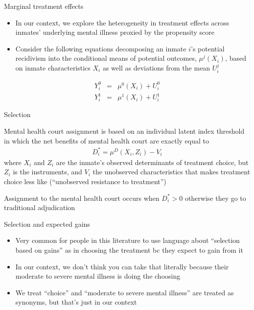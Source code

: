 \documentclass{beamer}
\begin{document}
\begin{frame}{Marginal treatment effects}

  \begin{itemize}
    \item In our context, we explore the heterogeneity in treatment effects across inmates' underlying mental illness proxied by the propensity score
    \item Consider the following equations decomposing an inmate $i$'s potential recidivism into the conditional means of potential outcomes, $\mu^j(X_i)$, based on inmate characteristics $X_i$ as well as deviations from the mean $U_i^j$
  \end{itemize}

  \begin{eqnarray*}
    Y_i^0 &=& \mu^0(X_i) + U_i^0 \\
    Y_i^1 &=& \mu^1(X_i) + U_i^1
  \end{eqnarray*}

\end{frame}

\begin{frame}{Selection}


  Mental health court assignment is based on an individual latent index threshold in which the net benefits of mental health court are exactly equal to
  \bigskip
  \begin{eqnarray*}
    D_i^* = \mu^D(X_i,Z_i) - V_i
  \end{eqnarray*}where $X_i$ and $Z_i$ are the inmate's observed determinants of treatment choice, but $Z_i$ is the instruments, and $V_i$ the unobserved characteristics that makes treatment choice less like (``unobserved resistance to treatment'')

  \bigskip

  Assignment to the mental health court occurs when $D_i^*>0$ otherwise they go to traditional adjudication

\end{frame}

\begin{frame}{Selection and expected gains}

  \begin{itemize}
    \item Very common for people in this literature to use language about ``selection based on gains'' as in choosing the treatment bc they expect to gain from it
    \item In our context, we don't think you can take that literally because their moderate to severe mental illness is doing the choosing
    \item We treat ``choice'' and ``moderate to severe mental illness'' are treated as synonyms, but that's just in our context
  \end{itemize}

\end{frame}
\end{document}
